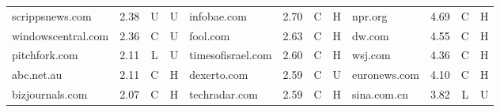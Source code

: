 \begin{table*}[htbp]
\begin{tabular}{lrcc|lrcc|lrcc}
scrippsnews.com & 2.38 & U & U & infobae.com & 2.70 & C & H & npr.org & 4.69 & C & H \\
windowscentral.com & 2.36 & C & U & fool.com & 2.63 & C & H & dw.com & 4.55 & C & H \\
pitchfork.com & 2.11 & L & U & timesofisrael.com & 2.60 & C & H & wsj.com & 4.36 & C & H \\
abc.net.au & 2.11 & C & H & dexerto.com & 2.59 & C & U & euronews.com & 4.10 & C & H \\
bizjournals.com & 2.07 & C & H & techradar.com & 2.59 & C & H & sina.com.cn & 3.82 & L & U \\
\bottomrule
\end{tabular}
\end{table*}